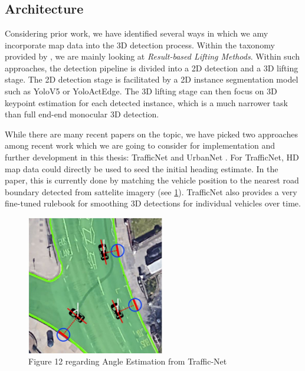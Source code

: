 \documentclass[RAIstudentexpose%
              ,optBibtex%
              ,optBibstyleAlphabetic%
              ,optEnglish%
              ]{RAIlatex}%
\begin{document}
\section{}

\subsection{Architecture}

Considering prior work, we have identified several ways in which we amy incorporate map data into the 3D detection process. Within the taxonomy provided by \cite{survey2022}, we are mainly looking at \textit{Result-based Lifting Methods}. Within such approaches, the detection pipeline is divided into a 2D detection and a 3D lifting stage. The 2D detection stage is facilitated by a 2D instance segmentation model such as YoloV5 or YoloActEdge. The 3D lifting stage can then focus on 3D keypoint estimation for each detected instance, which is a much narrower task than full end-end monocular 3D detection. \par

While there are many recent papers on the topic, we have picked two approaches among recent work which we are going to consider for implementation and further development in this thesis: TrafficNet \cite{trafficnet2021} and UrbanNet \cite{urbannet2021}. For TrafficNet, HD map data could directly be used to seed the initial heading estimate. In the paper, this is currently done by matching the vehicle position to the nearest road boundary detected from sattelite imagery (see \cref{fig:tranet-road-edge}). TrafficNet also provides a very fine-tuned rulebook for smoothing 3D detections for individual vehicles over time. \par

\begin{figure}[htb]%
    \centering
    \includegraphics[width=60mm]{angle-estimation}
    \caption{Figure 12 regarding Angle Estimation from Traffic-Net \cite{trafficnet2021}}
    \label{fig:tranet-road-edge}%
\end{figure}%
\end{document}
